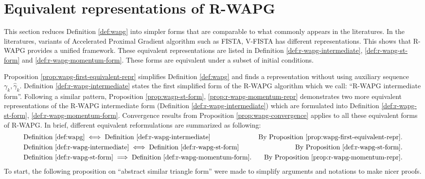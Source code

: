 \documentclass[12pt]{article}
\begin{document}
\section{Equivalent representations of R-WAPG}\label{sec:rwapg-equiv-repr}
    This section reduces Definition \ref{def:wapg} into simpler forms that are comparable to what commonly appears in the literatures. 
    In the literatures, variants of Accelerated Proximal Gradient algorithm such as FISTA, V-FISTA has different representations. 
    This shows that R-WAPG provides a unified framework. 
    These equivalent representations are listed in Definition \ref{def:r-wapg-intermediate}, \ref{def:r-wapg-st-form} and \ref{def:r-wapg-momentum-form}. 
    These forms are equivalent under a subset of initial conditions. 
    \par 
    Proposition \ref{prop:wapg-first-equivalent-repr} simplifies Definition \ref{def:wapg} and finds a representation without using auxiliary sequence $\gamma_k, \hat \gamma_k$. 
    Definition \ref{def:r-wapg-intermediate} states the first simplified form of the R-WAPG algorithm which we call: ``R-WAPG intermediate form''. 
    Following a similar pattern, Proposition \ref{prop:wagp-st-form}, \ref{prop:r-wapg-momentum-repr} demonstrates two more equivalent representations of the R-WAPG intermediate form (Definition \ref{def:r-wapg-intermediate}) which are formulated into Definition \ref{def:r-wapg-st-form}, \ref{def:r-wapg-momentum-form}. 
    Convergence results from Proposition \ref{prop:wapg-convergence} applies to all these equivalent forms of R-WAPG. 
    In brief, different equivalent reformulations are summarized as following: 
    \begin{align*}
        &\text{Definition \ref{def:wapg}}   \iff 
        \text{Definition \ref{def:r-wapg-intermediate}}  & \text{By Proposition \ref{prop:wapg-first-equivalent-repr}.}
        \\
        & \text{Definition \ref{def:r-wapg-intermediate}}
        \iff \text{Definition \ref{def:r-wapg-st-form}} & \text{By Proposition \ref{def:r-wapg-st-form}.}
        \\
        & 
        \text{Definition \ref{def:r-wapg-st-form}}\implies 
        \text{Definition }\ref{def:r-wapg-momentum-form}. 
        & \text{By Proposition }\ref{prop:r-wapg-momentum-repr}.
    \end{align*}
    To start, the following proposition on ``abstract similar triangle form'' were made to simplify arguments and notations to make nicer proofs. 
\end{document}
